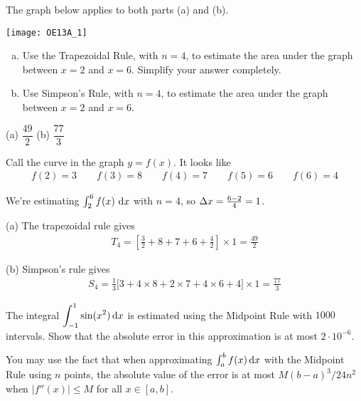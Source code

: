 \begin{Mquestion}[2013A]\label{prob_s1.11_tableproblem3}
The graph below applies to both parts (a) and (b).

\begin{center}
       \texttt{[image: OE13A\_1]}
\end{center}


\begin{enumerate}[(a)]
\item
Use the Trapezoidal Rule, with $n = 4$, to estimate
the area under the graph between $x = 2$ and $x = 6$.
Simplify your answer completely.
\item
Use Simpson's Rule, with $n = 4$, to estimate the
area under the graph between $x = 2$ and $x = 6$.
\end{enumerate}
\end{Mquestion}

\begin{answer}
(a) $\dfrac{49}{2}$
\qquad (b) $\dfrac{77}{3}$
\end{answer}

\begin{solution}
Call the curve in the graph $y=f(x)$. It looks like
\begin{align*}
f(2)=3 \qquad
f(3)=8 \qquad
f(4)=7 \qquad
f(5)=6 \qquad
f(6)=4
\end{align*}

We're estimating $\int_2^6 f(x)~\mathrm{d}x$ with $n=4$, so $\Delta x = \frac{6-2}{4}=1$.

\noindent (a)
The trapezoidal rule gives
\begin{align*}
T_4=\left[\frac{3}{2}+ 8+7+ 6+\frac{4}{2}\right]\times 1=\frac{49}{2}
\end{align*}

\noindent (b)
Simpson's rule gives
\begin{align*}
S_4=\frac{1}{3}\big[3+4\times 8+2\times 7+4\times 6+4\big]\times 1
=\frac{77}{3}
\end{align*}

\end{solution}


\begin{question}[2016Q4]\label{prob_s.1.11_error1}
The integral $\displaystyle\int_{-1}^{1} \sin(x^2) \, \mathrm{d}x$ is estimated using the Midpoint
Rule with $1000$ intervals.  Show that the absolute error in this approximation is at most
$2\cdot 10^{-6}$.

You may use the fact that when approximating $\int_a^b f(x) \, \mathrm{d}x$ with the
Midpoint Rule using $n$ points, the absolute value
of the error is at most $M(b-a)^3/24n^2$ when $\left|f''(x)\right|\leq M$
for all $x\in[a,b]$.
\end{question}

